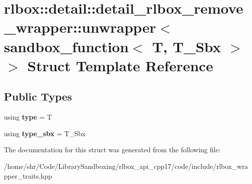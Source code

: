 \hypertarget{structrlbox_1_1detail_1_1detail__rlbox__remove__wrapper_1_1unwrapper_3_01sandbox__function_3_01T_00_01T__Sbx_01_4_01_4}{}\section{rlbox\+:\+:detail\+:\+:detail\+\_\+rlbox\+\_\+remove\+\_\+wrapper\+:\+:unwrapper$<$ sandbox\+\_\+function$<$ T, T\+\_\+\+Sbx $>$ $>$ Struct Template Reference}
\label{structrlbox_1_1detail_1_1detail__rlbox__remove__wrapper_1_1unwrapper_3_01sandbox__function_3_01T_00_01T__Sbx_01_4_01_4}
\subsection*{Public Types}
\begin{DoxyCompactItemize}
\item 
\mbox{\label{structrlbox_1_1detail_1_1detail__rlbox__remove__wrapper_1_1unwrapper_3_01sandbox__function_3_01T_00_01T__Sbx_01_4_01_4_a9e039719570357525aa740642bc2b21e}} 
using {\bfseries type} = T
\item 
\mbox{\label{structrlbox_1_1detail_1_1detail__rlbox__remove__wrapper_1_1unwrapper_3_01sandbox__function_3_01T_00_01T__Sbx_01_4_01_4_a435a03c5d1a60d9298a07cf792dcc1b5}} 
using {\bfseries type\+\_\+sbx} = T\+\_\+\+Sbx
\end{DoxyCompactItemize}


The documentation for this struct was generated from the following file\+:\begin{DoxyCompactItemize}
\item 
/home/shr/\+Code/\+Library\+Sandboxing/rlbox\+\_\+api\+\_\+cpp17/code/include/rlbox\+\_\+wrapper\+\_\+traits.\+hpp\end{DoxyCompactItemize}
